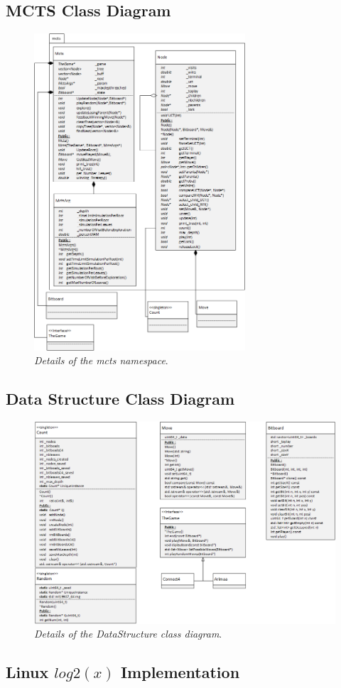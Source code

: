 \subsection{MCTS Class Diagram}
\begin{figure}[H] 
\centerline{\includegraphics[width=0.7\textwidth]{Annexes/Img/MCTS.png}}
\caption{\label{fig:mctsclassdiagram}\textit{Details of the mcts namespace}.}
\end{figure}

\subsection{Data Structure Class Diagram}
\begin{figure}[H] 
\centerline{\includegraphics[width=\textwidth]{Annexes/Img/DataStructure.png}}
\caption{\label{fig:datastructuredetails}\textit{Details of the DataStructure class diagram}.}
\end{figure}

\subsection{Linux \ensuremath{log2(x)} Implementation \cite{fast_log}} \label{subsec:fastLog}


